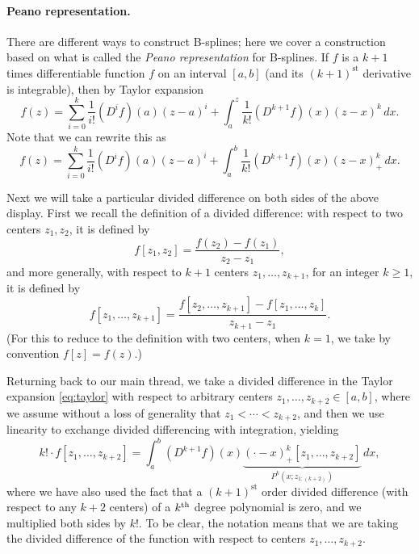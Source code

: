 \documentclass{article}
\begin{document}
\paragraph{Peano representation.}

\def\st{^{\text{st}}}

There are different ways to construct B-splines; here we cover a construction
based on what is called the \emph{Peano representation} for B-splines. If $f$ is
a $k+1$ times differentiable function $f$ on an interval $[a,b]$ (and its
$(k+1)\st$ derivative is integrable), then by Taylor expansion
\[
f(z) = \sum_{i=0}^k \frac{1}{i!} (D^i f)(a) (z-a)^i + 
\int_a^z \frac{1}{k!} (D^{k+1} f)(x) (z-x)^k \, dx.
\]
Note that we can rewrite this as
\begin{equation}
\label{eq:taylor}
f(z) = \sum_{i=0}^k \frac{1}{i!} (D^i f)(a) (z-a)^i + 
\int_a^b \frac{1}{k!} (D^{k+1} f)(x) (z-x)^k_+ \, dx. 
\end{equation}

Next we will take a particular divided difference on both sides of the above
display. First we recall the definition of a divided difference: with respect to
two centers $z_1,z_2$, it is defined by       
\[
f[z_1,z_2] =  \frac{f(z_2)-f(z_1)}{z_2-z_1},
\]
and more generally, with respect to $k+1$ centers $z_1,\dots,z_{k+1}$, for an
integer $k \geq 1$, it is defined by  
\[
f[z_1,\dots,z_{k+1}] = \frac{f[z_2,\dots,z_{k+1}] -
f[z_1,\dots,z_k]}{z_{k+1}-z_1}.
\]
(For this to reduce to the definition with two centers, when $k=1$, we take by 
convention $f[z]=f(z)$.)   

Returning back to our main thread, we take a divided difference in the Taylor
expansion \eqref{eq:taylor} with respect to arbitrary centers $z_1,\dots,z_{k+2}
\in [a,b]$, where we assume without a loss of generality that $z_1 < \cdots <
z_{k+2}$, and then we use linearity to exchange divided differencing with
integration, yielding   
\begin{equation}
\label{eq:peano}
k! \cdot f[z_1,\dots,z_{k+2}] = \int_a^b (D^{k+1} f)(x)
\underbrace{(\cdot-x)^k_+[z_1,\dots,z_{k+2}]}_{P^k(x; z_{1:(k+2)})} \, dx, 
\end{equation}
where we have also used the fact that a $(k+1)\st$ order divided difference (with
respect to any $k+2$ centers) of a $k^{\text{th}}$ degree polynomial is zero, and we
multiplied both sides by $k!$. To be clear, the notation  means that we are taking the divided difference of
the function  with respect to centers
$z_1,\dots,z_{k+2}$.    
\end{document}
